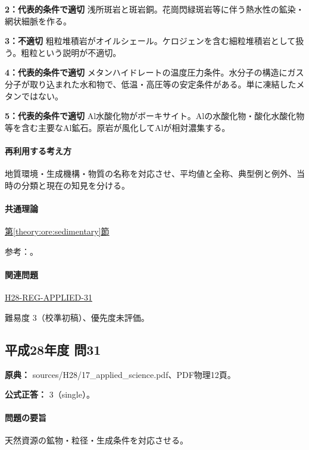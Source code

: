 \noindent\textbf{2：代表的条件で適切} 浅所斑岩と斑岩銅。花崗閃緑斑岩等に伴う熱水性の鉱染・網状細脈を作る。\par

\noindent\textbf{3：不適切} 粗粒堆積岩がオイルシェール。ケロジェンを含む細粒堆積岩として扱う。粗粒という説明が不適切。\par

\noindent\textbf{4：代表的条件で適切} メタンハイドレートの温度圧力条件。水分子の構造にガス分子が取り込まれた水和物で、低温・高圧等の安定条件がある。単に凍結したメタンではない。\par

\noindent\textbf{5：代表的条件で適切} Al水酸化物がボーキサイト。Alの水酸化物・酸化水酸化物等を含む主要なAl鉱石。原岩が風化してAlが相対濃集する。\par

\paragraph{再利用する考え方} 地質環境・生成機構・物質の名称を対応させ、平均値と全称、典型例と例外、当時の分類と現在の知見を分ける。

\paragraph{共通理論} \hyperref[theory:ore:sedimentary]{第\ref*{theory:ore:sedimentary}節}

\par 参考：\cite{ore50_oilshale_ref,ore50_bauxite_ref,ore50_bif_ref}。

\paragraph{関連問題} \hyperref[q:h28-reg-applied-31]{H28-REG-APPLIED-31}

\par 難易度 3（校準初稿）、優先度未評価。

\subsection{平成28年度 問31}
\label{q:h28-reg-applied-31}

\noindent\textbf{原典：} sources/H28/17\_applied\_science.pdf、PDF物理12頁。

\textbf{公式正答：} 3（single）。

\paragraph{問題の要旨} 天然資源の鉱物・粒径・生成条件を対応させる。


